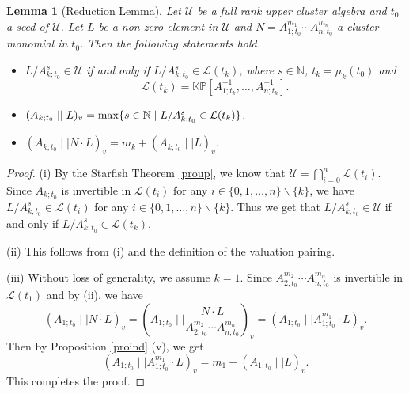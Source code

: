 \documentclass{amsart}
\newtheorem{lemma}[theorem]{Lemma}
\theoremstyle{definition}
\theoremstyle{remark}
\numberwithin{equation}{section}
\begin{document}
\begin{lemma}[Reduction Lemma]\label{lemadd}
Let $\mathcal U$ be a full rank upper cluster algebra and $t_0$ a seed of $\mathcal U$. Let $L$ be a non-zero element in $\mathcal U$ and $N=A_{1;t_0}^{m_1}\cdots A_{n;t_0}^{m_n}$ a cluster monomial in $t_0$. Then the following statements hold.
\begin{itemize}
\item[(i)] $L/A_{k;t_0}^s\in\mathcal U$ if and only if $L/A_{k;t_0}^s\in\mathcal L(t_k)$, where $s\in\mathbb N$, $t_k=\mu_k(t_0)$ and $$\mathcal L(t_k)=\mathbb{KP}[A_{1;t_k}^{\pm1},\ldots,A_{n;t_k}^{\pm1}].$$
\item[(ii)]  $(A_{k;t_0}\mid\mid  L)_v={\rm max}\{s\in\mathbb N\mid L/A_{k;t_0}^s\in\mathcal L(t_k)\}$.
\item[(iii)] $(A_{k;t_0}\mid\mid  N\cdot L)_v=m_k+(A_{k;t_0}\mid\mid  L)_v$.
\end{itemize}
\end{lemma}
\begin{proof}
(i)
By the Starfish Theorem \ref{proup}, we know that  $\mathcal U=\bigcap\limits_{i=0}^n\mathcal L(t_i)$. Since $A_{k;t_0}$ is invertible in $\mathcal L(t_i)$ for any $i\in\{0,1,\ldots,n\}\backslash\{k\}$, we have $L/A_{k;t_0}^s\in\mathcal L(t_i)$ for any $i\in\{0,1,\ldots,n\}\backslash\{k\}$. Thus we get that $L/A_{k;t_0}^s\in\mathcal U$ if and only if $L/A_{k;t_0}^s\in\mathcal L(t_k)$.


(ii) This follows from (i) and the definition of the valuation pairing.


(iii) Without loss of generality, we assume $k=1$. Since $A_{2;t_0}^{m_2}\cdots A_{n;t_0}^{m_n}$ is invertible in $\mathcal L(t_1)$ and by (ii), we have  $$(A_{1;t_0}\mid\mid  N\cdot L)_v=(A_{1;t_0}\mid\mid  \frac{N\cdot L}{A_{2;t_0}^{m_2}\cdots A_{n;t_0}^{m_n}})_v=(A_{1;t_0}\mid\mid  A_{1;t_0}^{m_1}\cdot L)_v.$$ Then by Proposition \ref{proind} (v), we get $$(A_{1;t_0}\mid\mid   A_{1;t_0}^{m_1}\cdot L)_v=m_1+(A_{1;t_0}\mid\mid  L)_v.$$
This completes the proof.
\end{proof}
\end{document}
